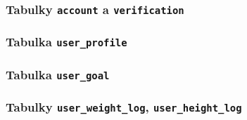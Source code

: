 \subsubsection{Tabulky \texttt{account} a \texttt{verification}}

\subsubsection{Tabulka \texttt{user\_profile}}

\subsubsection{Tabulka \texttt{user\_goal}}

\subsubsection{Tabulky \texttt{user\_weight\_log}, \texttt{user\_height\_log}}

